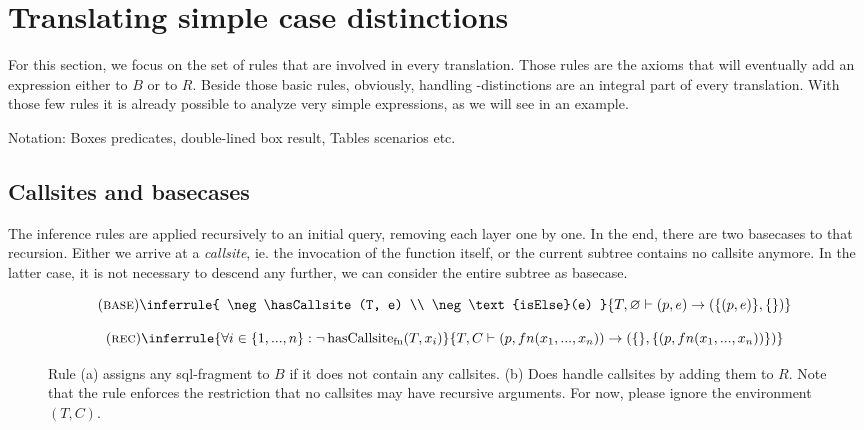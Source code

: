 \section{Translating simple case distinctions}

For this section, we focus on the set of rules that are involved in every translation. Those rules are the axioms that will eventually add an expression either to $B$ or to $R$. Beside those basic rules, obviously, handling \CASE-distinctions are an integral part of every translation. With those few rules it is already possible to analyze very simple expressions, as we will see in an example.

Notation: Boxes predicates, double-lined box result, Tables scenarios etc.

\subsection{Callsites and basecases}
The inference rules are applied recursively to an initial query, removing each layer one by one. In the end, there are two basecases to that recursion. Either we arrive at a \textit{callsite}, ie. the invocation of the function itself, or the current subtree contains no callsite anymore. In the latter case, it is not necessary to descend any further, we can consider the entire subtree as basecase.

\begin{figure}[h]
    \begin{minipage}[b]{.5\linewidth}
    \centering %
$$\quad(\textsc{base})\inferrule{
   \neg \hasCallsite(T, e) \\
   \neg \text{isElse}(e)
}{
    T, \varnothing \vdash (p, e) \rightarrow (\{(p, e)\},\{\})
}$$
    \subcaption{}\label{rule:base}
    \end{minipage}\hfill
    \begin{minipage}[b]{.5\linewidth}
    \centering %
$$\quad(\textsc{rec})\inferrule{
   \forall i \in \{1, ..., n\} : \neg \hasCallsite(T, x_i)
}{
    T, C \vdash (p, fn(x_1, ..., x_n)) \rightarrow (\{\}, \{(p, fn(x_1, ..., x_n))\})
}$$
    \label{rule:rec}
    \end{minipage}
    \caption{Rule (a) assigns any sql-fragment to $B$ if it does not contain any callsites. (b) Does handle callsites by adding them to $R$. Note that the rule enforces the restriction that no callsites may have recursive arguments. For now, please ignore the environment $(T, C)$.}\label{rule:base_and_rec}
\end{figure}

